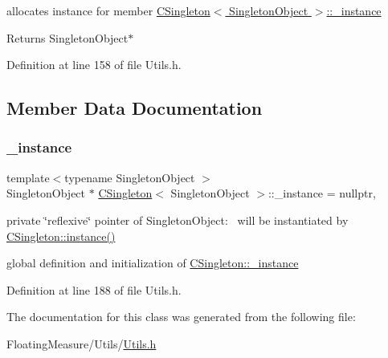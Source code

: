 allocates instance for member \hyperlink{classCSingleton_a690e0816be5d469e60d074cf8c5d139c}{C\+Singleton$<$ Singleton\+Object $>$\+::\+\_\+instance} 

\begin{DoxyReturn}{Returns}
Singleton\+Object$\ast$ 
\end{DoxyReturn}


Definition at line 158 of file Utils.\+h.



\subsection{Member Data Documentation}
\mbox{\label{classCSingleton_a690e0816be5d469e60d074cf8c5d139c}} 
\subsubsection{\texorpdfstring{\+\_\+instance}{\_instance}}
{\footnotesize\ttfamily template$<$typename Singleton\+Object $>$ \\
Singleton\+Object $\ast$ \hyperlink{classCSingleton}{C\+Singleton}$<$ Singleton\+Object $>$\+::\+\_\+instance = nullptr\hspace{0.3cm}{\ttfamily [static]}, {\ttfamily [private]}}



private \char`\"{}reflexive\char`\"{} pointer of Singleton\+Object\+:~\newline
 will be instantiated by \hyperlink{classCSingleton_a58f5ac3aaaea8079a373350594726bdf}{C\+Singleton\+::instance()} 

global definition and initialization of \hyperlink{classCSingleton_a690e0816be5d469e60d074cf8c5d139c}{C\+Singleton\+::\+\_\+instance} 

Definition at line 188 of file Utils.\+h.



The documentation for this class was generated from the following file\+:\begin{DoxyCompactItemize}
\item 
Floating\+Measure/\+Utils/\hyperlink{Utils_8h}{Utils.\+h}\end{DoxyCompactItemize}
